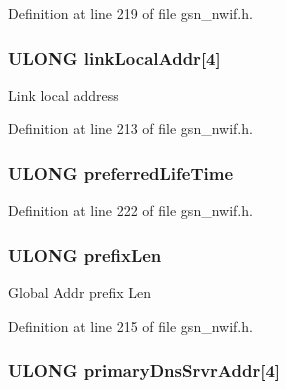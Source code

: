 Definition at line 219 of file gsn\_\-nwif.h.

\hypertarget{a00171_a4632397f7ce2a59255969233e3f055b2}{
\subsubsection[{linkLocalAddr}]{\setlength{\rightskip}{0pt plus 5cm}ULONG {\bf linkLocalAddr}\mbox{[}4\mbox{]}}}
\label{a00171_a4632397f7ce2a59255969233e3f055b2}
Link local address 

Definition at line 213 of file gsn\_\-nwif.h.

\hypertarget{a00171_aa1af5850f2fa01dba672f616daf05b72}{
\subsubsection[{preferredLifeTime}]{\setlength{\rightskip}{0pt plus 5cm}ULONG {\bf preferredLifeTime}}}
\label{a00171_aa1af5850f2fa01dba672f616daf05b72}


Definition at line 222 of file gsn\_\-nwif.h.

\hypertarget{a00171_a8fcc1a040757ed6cb91e94b1b995d953}{
\subsubsection[{prefixLen}]{\setlength{\rightskip}{0pt plus 5cm}ULONG {\bf prefixLen}}}
\label{a00171_a8fcc1a040757ed6cb91e94b1b995d953}
Global Addr prefix Len 

Definition at line 215 of file gsn\_\-nwif.h.

\hypertarget{a00171_af5d07e64903810b25771526492c59b81}{
\subsubsection[{primaryDnsSrvrAddr}]{\setlength{\rightskip}{0pt plus 5cm}ULONG {\bf primaryDnsSrvrAddr}\mbox{[}4\mbox{]}}}
\label{a00171_af5d07e64903810b25771526492c59b81}



